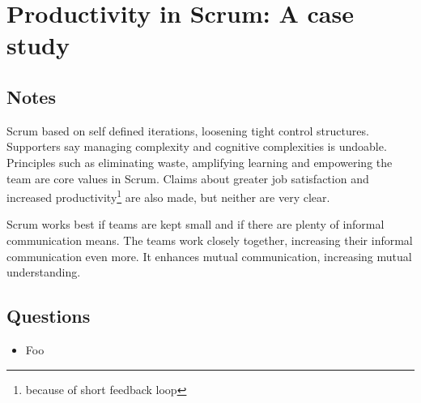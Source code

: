 \chapter{Productivity in Scrum: A case study \cite{dongen2011productivity}}
\section{Notes}
Scrum based on self defined iterations, loosening tight control structures. 
Supporters say managing complexity and cognitive complexities is undoable.
Principles such as eliminating waste, amplifying learning and empowering the team are core values in Scrum.
Claims about greater job satisfaction and increased productivity\footnote{because of short feedback loop} are also made, but neither are very clear.

Scrum works best if teams are kept small and if there are plenty of informal communication means. 
The teams work closely together, increasing their informal communication even more. 
It enhances mutual communication, increasing mutual understanding. 





\section{Questions}
\begin{itemize}
  \item Foo
\end{itemize}
